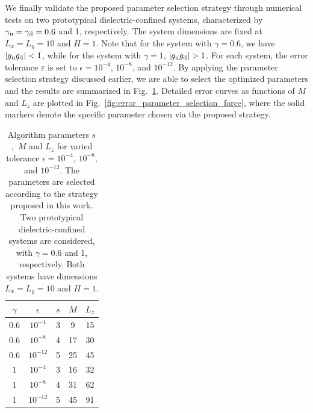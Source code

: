 We finally validate the proposed parameter selection strategy through numerical tests on two prototypical dielectric-confined systems, characterized by $\gamma_{\text{u}} = \gamma_{\text{d}} = 0.6$ and 1, respectively. 
The system dimensions are fixed at $L_x=L_y=10$ and $H = 1$. 
Note that for the system with $\gamma=0.6$, we have $|g_{\text{u}}g_{\text{d}}|<1$, while for the system with $\gamma=1$, $|g_{\T u}g_{\T d}|>1$.
For each system, the error tolerance $\varepsilon$ is set to $\epsilon = 10^{-4}$, $10^{-8}$, and $10^{-12}$. 
By applying the parameter selection strategy discussed earlier, we are able to select the optimized parameters and the results are summarized in Fig.~\ref{tab:parameter_selection_results}. 
Detailed error curves as functions of $M$ and $L_z$ are plotted in Fig.~\ref{fig:error_parameter_selection_force}, where the solid markers denote the specific parameter chosen via the proposed strategy.
\begin{table}[htbp]
    \centering
    \begin{tabular}{|c|c|c|c|c|}
        \hline
        $\gamma$ & $\epsilon$ & $s$ & $M$ & $L_z$ \\
        \hline
        $0.6$ & $10^{-4}$ & 3 & 9 & 15 \\
        $0.6$ & $10^{-8}$ & 4 & 17 & 30 \\
        $0.6$ & $10^{-12}$ & 5 & 25 & 45 \\
        $1$ & $10^{-4}$ & 3 & 16 & 32 \\
        $1$ & $10^{-8}$ & 4 & 31 & 62 \\
        $1$ & $10^{-12}$ & 5 & 45 & 91 \\
        \hline
    \end{tabular}
    \caption{Algorithm parameters $s$,~$M$ and $L_z$ for varied tolerance $\epsilon = 10^{-4}$, $10^{-8}$, and $10^{-12}$. 
    The parameters are selected according to the strategy proposed in this work. Two prototypical dielectric-confined systems are considered, with $\gamma=0.6$ and 1, respectively. Both systems have dimensions $L_x=L_y=10$ and $H = 1$.} \label{tab:parameter_selection_results}
\end{table}
